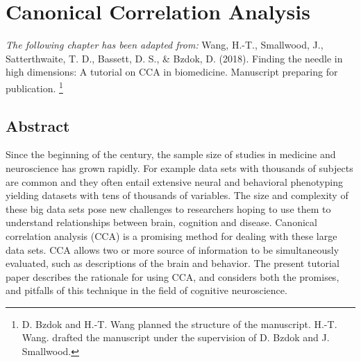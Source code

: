 \chapter{Canonical Correlation Analysis}
\label{ch:methods}


\textit{The following chapter has been adapted from:}
Wang, H.-T., Smallwood, J., Satterthwaite, T. D., Bassett, D. S., \& Bzdok, D. (2018). Finding the needle in high dimensions: A tutorial on CCA in biomedicine. Manuscript preparing for publication.
\footnote{D. Bzdok and H.-T. Wang planned the structure of the manuscript.  H.-T. Wang. drafted the manuscript under the supervision of D. Bzdok and J. Smallwood.}
\section{Abstract}

Since the beginning of the  century, the sample size of studies in medicine and neuroscience has grown rapidly. For example data sets with thousands of subjects are common and they often entail extensive neural and behavioral phenotyping yielding datasets with tens of thousands of variables. The size and complexity of these big data sets pose new challenges to researchers hoping to use them to understand relationships between brain, cognition and disease. Canonical correlation analysis (CCA) is a promising method for dealing with these large data sets. CCA allows two or more source of information to be simultaneously evaluated, such as descriptions of the brain and behavior. The present tutorial paper describes the rationale for using CCA, and considers both the promises, and pitfalls of this technique in the field of cognitive neuroscience.


